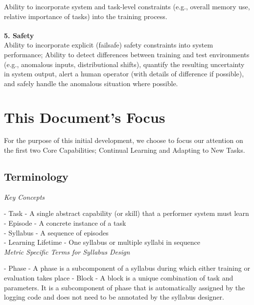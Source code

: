 Ability to incorporate system and task-level constraints (e.g., overall memory use, relative importance of tasks) into the training process.\\
\\
\textbf{5. Safety}\\

Ability to incorporate explicit (failsafe) safety constraints into system performance; Ability to detect differences between training and test environments (e.g., anomalous inputs, distributional shifts), quantify the resulting uncertainty in system output, alert a human operator (with details of difference if possible), and safely handle the anomalous situation where possible.


\section{This Document's Focus}

For the purpose of this initial development, we choose to focus our attention on the first two Core Capabilities; Continual Learning and Adapting to New Tasks. 

\subsection*{Terminology}

\textit{Key Concepts}

- Task
    - A single abstract capability (or skill) that a performer system must learn\\
- Episode
    - A concrete instance of a task\\
- Syllabus
    - A sequence of episodes\\
- Learning Lifetime
    - One syllabus or multiple syllabi in sequence\\
    
\textit{Metric Specific Terms for Syllabus Design}
    
- Phase
    - A phase is a subcomponent of a syllabus during which either training or evaluation takes place
- Block
    - A block is a unique combination of task and parameters. It is a subcomponent of phase that is automatically assigned by the logging code and does not need to be annotated by the syllabus designer.\\

